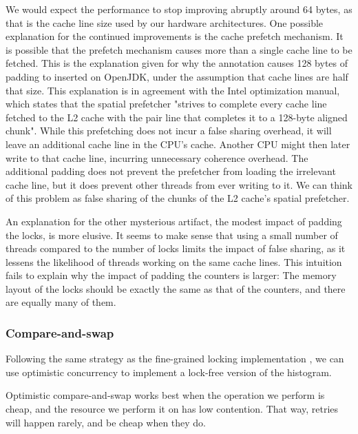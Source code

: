 We would expect the performance to stop improving abruptly around 64
bytes, as that is the cache line size used by our hardware architectures.
One possible explanation for the continued improvements is the cache prefetch mechanism.
It is possible that the prefetch mechanism causes more than a single cache line
to be fetched. This is the explanation given for why the 
annotation causes 128 bytes of padding to inserted on OpenJDK, under the
assumption that cache lines are half that size\cite{openjdkmailcontended}.
This explanation is in agreement with the Intel optimization
manual\cite{inteloptimize}, which states that the spatial prefetcher
"strives to complete every cache line fetched to the L2 cache with the pair line
that completes it to a 128-byte aligned chunk"\footnotemark. While this
prefetching does not incur a false sharing overhead, it will leave an additional
cache line in the CPU's cache. Another CPU might then later write to that
cache line, incurring unnecessary coherence overhead. The additional padding
does not prevent the prefetcher from loading the irrelevant cache line, but it
does prevent other threads from ever writing to it. We can think of this problem
as false sharing of the chunks of the L2 cache's spatial prefetcher.

An explanation for the other mysterious artifact, the modest impact of padding
the locks, is more elusive. It seems to make sense that using a small number of
threads compared to the number of locks limits the impact of false sharing, as
it lessens the likelihood of threads working on the same cache lines. This
intuition fails to explain why the impact of padding the counters is larger: The
memory layout of the locks should be exactly the same as that of the counters,
and there are equally many of them.




\subsubsection{Compare-and-swap}
Following the same strategy as the fine-grained locking implementation
, we can use optimistic concurrency to implement a lock-free version of
the histogram.

Optimistic compare-and-swap works best when the operation we perform is cheap,
and the resource we perform it on has low contention. That way, retries will
happen rarely, and be cheap when they do.

